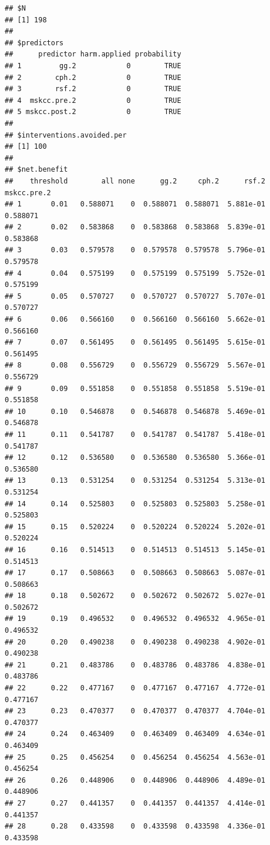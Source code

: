 \documentclass{article}\usepackage[]{graphicx}\usepackage[]{color}
\makeatletter
\newenvironment{kframe}{%
 \def\at@end@of@kframe{}%
 \ifinner\ifhmode%
  \def\at@end@of@kframe{\end{minipage}}%
  \begin{minipage}{\columnwidth}%
 \fi\fi%
 \def\FrameCommand##1{\hskip\@totalleftmargin \hskip-\fboxsep
 \colorbox{shadecolor}{##1}\hskip-\fboxsep
     \hskip-\linewidth \hskip-\@totalleftmargin \hskip\columnwidth}%
 \MakeFramed {\advance\hsize-\width
   \@totalleftmargin\z@ \linewidth\hsize
   \@setminipage}}%
 {\par\unskip\endMakeFramed%
 \at@end@of@kframe}
\newenvironment{knitrout}{}{} %
\makeatother
\begin{document}
\begin{knitrout}
\begin{kframe}\begin{verbatim}
## $N
## [1] 198
## 
## $predictors
##      predictor harm.applied probability
## 1         gg.2            0        TRUE
## 2        cph.2            0        TRUE
## 3        rsf.2            0        TRUE
## 4  mskcc.pre.2            0        TRUE
## 5 mskcc.post.2            0        TRUE
## 
## $interventions.avoided.per
## [1] 100
## 
## $net.benefit
##    threshold        all none      gg.2     cph.2      rsf.2 mskcc.pre.2
## 1       0.01   0.588071    0  0.588071  0.588071  5.881e-01    0.588071
## 2       0.02   0.583868    0  0.583868  0.583868  5.839e-01    0.583868
## 3       0.03   0.579578    0  0.579578  0.579578  5.796e-01    0.579578
## 4       0.04   0.575199    0  0.575199  0.575199  5.752e-01    0.575199
## 5       0.05   0.570727    0  0.570727  0.570727  5.707e-01    0.570727
## 6       0.06   0.566160    0  0.566160  0.566160  5.662e-01    0.566160
## 7       0.07   0.561495    0  0.561495  0.561495  5.615e-01    0.561495
## 8       0.08   0.556729    0  0.556729  0.556729  5.567e-01    0.556729
## 9       0.09   0.551858    0  0.551858  0.551858  5.519e-01    0.551858
## 10      0.10   0.546878    0  0.546878  0.546878  5.469e-01    0.546878
## 11      0.11   0.541787    0  0.541787  0.541787  5.418e-01    0.541787
## 12      0.12   0.536580    0  0.536580  0.536580  5.366e-01    0.536580
## 13      0.13   0.531254    0  0.531254  0.531254  5.313e-01    0.531254
## 14      0.14   0.525803    0  0.525803  0.525803  5.258e-01    0.525803
## 15      0.15   0.520224    0  0.520224  0.520224  5.202e-01    0.520224
## 16      0.16   0.514513    0  0.514513  0.514513  5.145e-01    0.514513
## 17      0.17   0.508663    0  0.508663  0.508663  5.087e-01    0.508663
## 18      0.18   0.502672    0  0.502672  0.502672  5.027e-01    0.502672
## 19      0.19   0.496532    0  0.496532  0.496532  4.965e-01    0.496532
## 20      0.20   0.490238    0  0.490238  0.490238  4.902e-01    0.490238
## 21      0.21   0.483786    0  0.483786  0.483786  4.838e-01    0.483786
## 22      0.22   0.477167    0  0.477167  0.477167  4.772e-01    0.477167
## 23      0.23   0.470377    0  0.470377  0.470377  4.704e-01    0.470377
## 24      0.24   0.463409    0  0.463409  0.463409  4.634e-01    0.463409
## 25      0.25   0.456254    0  0.456254  0.456254  4.563e-01    0.456254
## 26      0.26   0.448906    0  0.448906  0.448906  4.489e-01    0.448906
## 27      0.27   0.441357    0  0.441357  0.441357  4.414e-01    0.441357
## 28      0.28   0.433598    0  0.433598  0.433598  4.336e-01    0.433598

\end{verbatim}
\end{kframe}
\end{knitrout}
\end{document}
